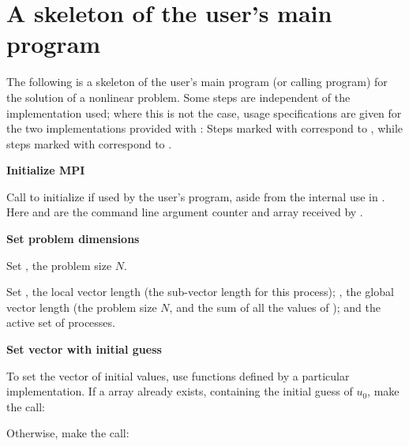\section{A skeleton of the user's main program}\label{s:skeleton_sol}

The following is a skeleton of the user's main program (or calling
program) for the solution of a nonlinear problem. 
Some steps are independent of the {\nvector} implementation used; 
where this is not the case, usage specifications are given for the two implementations 
provided with {\kinsol}: Steps marked with {\p} correspond to 
{\nvecp}, while steps marked with {\s} correspond to {\nvecs}.
\begin{Steps}
  
\item 
  {\bf {\p} Initialize MPI}

  Call  to initialize {\mpi} if used by
  the user's program, aside from the internal use in {\nvecp}.  
  Here  and  are the command line argument 
  counter and array received by .
  
\item
  {\bf Set problem dimensions}

  {\s} Set , the problem size $N$.

  {\p} Set , the local vector length (the sub-vector
  length for this process); , the global vector length (the
  problem size $N$, and the sum of all the values of );
  and the active set of processes.
  
\item
  {\bf Set vector with initial guess}
 
  To set the vector  of initial values, use functions defined by a
  particular {\nvector} implementation.  If a  array  
  already exists, containing the initial guess of $u_0$, make the call:

  {\s} 

  {\p} 

  Otherwise, make the call:

  {\s} 

  {\p} 


\end{Steps}

